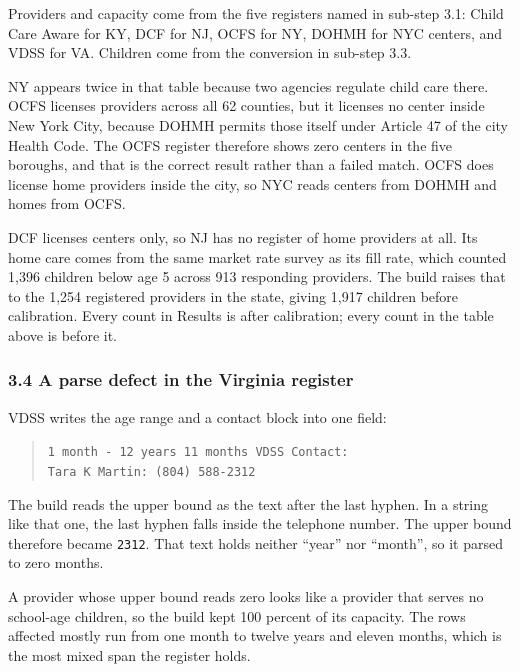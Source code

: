 \documentclass[11pt]{article}
\begin{document}
Providers and capacity come from the five registers named in sub-step 3.1: Child
Care Aware for KY, DCF for NJ, OCFS for NY, DOHMH for NYC centers, and VDSS for
VA. Children come from the conversion in sub-step 3.3.

NY appears twice in that table because two agencies regulate child care there.
OCFS licenses providers across all 62 counties, but it licenses no center inside
New York City, because DOHMH permits those itself under Article 47 of the city
Health Code. The OCFS register therefore shows zero centers in the five
boroughs, and that is the correct result rather than a failed match. OCFS does
license home providers inside the city, so NYC reads centers from DOHMH and
homes from OCFS.

DCF licenses centers only, so NJ has no register of home providers at all. Its
home care comes from the same market rate survey as its fill rate, which counted
1,396 children below age 5 across 913 responding providers. The build raises
that to the 1,254 registered providers in the state, giving 1,917 children
before calibration. Every count in Results is after calibration; every count in
the table above is before it.

\subsubsection*{3.4 A parse defect in the Virginia register}

VDSS writes the age range and a contact block into one field:

\begin{quote}
\small\texttt{1 month - 12 years 11 months VDSS Contact:}\\
\small\texttt{Tara K Martin: (804) 588-2312}
\end{quote}

The build reads the upper bound as the text after the last hyphen. In a string like that one, the
last hyphen falls inside the telephone number. The upper bound therefore became
\texttt{2312}. That text holds neither ``year'' nor ``month'', so it parsed to
zero months.

A provider whose upper bound reads zero looks like a provider that serves no
school-age children, so the build kept 100 percent of its capacity. The rows
affected mostly run from one month to twelve years and eleven months, which is
the most mixed span the register holds.
\end{document}
